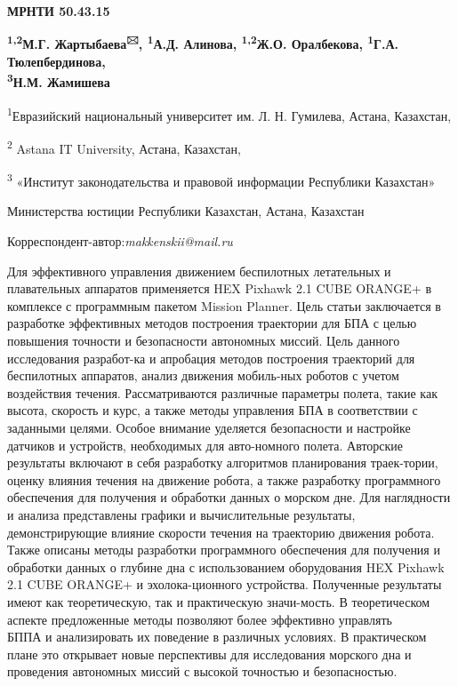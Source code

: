 
\newpage
{\bfseries МРНТИ 50.43.15}


\begin{center}
{\bfseries \textsuperscript{1,2}М.Г. Жартыбаева\textsuperscript{🖂},
\textsuperscript{1}А.Д. Алинова, \textsuperscript{1,2}Ж.О. Оралбекова,
\textsuperscript{1}Г.А. Тюлепбердинова,\\
\textsuperscript{3}Н.М. Жамишева}

\textsuperscript{1}Евразийский национальный университет им. Л. Н.
Гумилева, Астана, Казахстан,

\textsuperscript{2} Astana IT University, Астана, Казахстан,

\textsuperscript{3} «Институт законодательства и правовой информации
Республики Казахстан»

Министерства юстиции Республики Казахстан, Астана, Казахстан

\end{center}
Корреспондент-автор:\emph{makkenskii@mail.ru}\vspace{0.5cm}

Для эффективного управления движением беспилотных летательных и
плавательных аппаратов применяется HEX Pixhawk 2.1 CUBE ORANGE+ в
комплексе с программным пакетом Mission Planner. Цель статьи заключается
в разработке эффективных методов построения траектории для БПА с целью
повышения точности и безопасности автономных миссий. Цель данного
исследования разработ-ка и апробация методов построения траекторий для
беспилотных аппаратов, анализ движения мобиль-ных роботов с учетом
воздействия течения. Рассматриваются различные параметры полета, такие
как высота, скорость и курс, а также методы управления БПА в
соответствии с заданными целями. Особое внимание уделяется безопасности
и настройке датчиков и устройств, необходимых для авто-номного полета.
Авторские результаты включают в себя разработку алгоритмов планирования
траек-тории, оценку влияния течения на движение робота, а также
разработку программного обеспечения для получения и обработки данных о
морском дне. Для наглядности и анализа представлены графики и
вычислительные результаты, демонстрирующие влияние скорости течения на
траекторию движения робота. Также описаны методы разработки программного
обеспечения для получения и обработки данных о глубине дна с
использованием оборудования HEX Pixhawk 2.1 CUBE ORANGE+ и
эхолока-ционного устройства. Полученные результаты имеют как
теоретическую, так и практическую значи-мость. В теоретическом аспекте
предложенные методы позволяют более эффективно управлять\\БППА и
анализировать их поведение в различных условиях. В практическом плане
это открывает новые перспективы для исследования морского дна и
проведения автономных миссий с высокой точностью и безопасностью.

